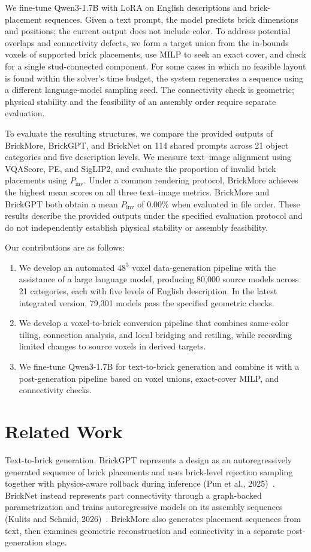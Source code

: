 \documentclass[10pt,twocolumn,letterpaper]{article}
\begin{document}
We fine-tune Qwen3-1.7B with LoRA on English descriptions and brick-placement sequences. Given a text prompt, the model predicts brick dimensions and positions; the current output does not include color. To address potential overlaps and connectivity defects, we form a target union from the in-bounds voxels of supported brick placements, use MILP to seek an exact cover, and check for a single stud-connected component. For some cases in which no feasible layout is found within the solver's time budget, the system regenerates a sequence using a different language-model sampling seed. The connectivity check is geometric; physical stability and the feasibility of an assembly order require separate evaluation.

To evaluate the resulting structures, we compare the provided outputs of BrickMore, BrickGPT, and BrickNet on 114 shared prompts across 21 object categories and five description levels. We measure text--image alignment using VQAScore, PE, and SigLIP2, and evaluate the proportion of invalid brick placements using $P_{\mathrm{inv}}$. Under a common rendering protocol, BrickMore achieves the highest mean scores on all three text--image metrics. BrickMore and BrickGPT both obtain a mean $P_{\mathrm{inv}}$ of 0.00\% when evaluated in file order. These results describe the provided outputs under the specified evaluation protocol and do not independently establish physical stability or assembly feasibility.

Our contributions are as follows:

\begin{enumerate}
\item We develop an automated $48^3$ voxel data-generation pipeline with the assistance of a large language model, producing 80,000 source models across 21 categories, each with five levels of English description. In the latest integrated version, 79,301 models pass the specified geometric checks.
\item We develop a voxel-to-brick conversion pipeline that combines same-color tiling, connection analysis, and local bridging and retiling, while recording limited changes to source voxels in derived targets.
\item We fine-tune Qwen3-1.7B for text-to-brick generation and combine it with a post-generation pipeline based on voxel unions, exact-cover MILP, and connectivity checks.
\end{enumerate}
\section{Related Work}
Text-to-brick generation. BrickGPT represents a design as an autoregressively generated sequence of brick placements and uses brick-level rejection sampling together with physics-aware rollback during inference (Pun et al., 2025)~\cite{brickgpt}. BrickNet instead represents part connectivity through a graph-backed parametrization and trains autoregressive models on its assembly sequences (Kulits and Schmid, 2026)~\cite{bricknet}. BrickMore also generates placement sequences from text, then examines geometric reconstruction and connectivity in a separate post-generation stage.
\end{document}
